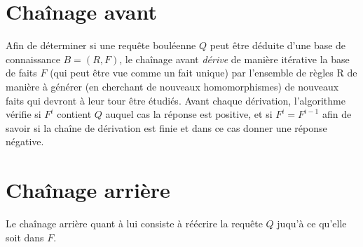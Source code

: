 
\section{Chaînage avant}\label{def_forward}

Afin de déterminer si une requête bouléenne $Q$ peut être déduite d'une base de connaissance 
$B = (R,F)$, 
le chaînage avant {\em dérive} de manière itérative la base de faits $F$ (qui peut être 
vue comme un fait unique) par l'ensemble de  règles R de manière à générer (en cherchant
de nouveaux homomorphismes) de nouveaux faits qui devront à leur tour être étudiés.
Avant chaque dérivation, l'algorithme vérifie si $F^i$ contient $Q$ auquel cas la réponse 
est positive, et si $F^{i} = F^{i-1}$ afin de savoir si la chaîne de dérivation est finie et 
dans ce cas donner une réponse négative.




\section{Chaînage arrière}\label{def_backward}
Le chaînage arrière quant à lui consiste à réécrire la requête $Q$ juqu'à ce qu'elle soit
dans $F$.

